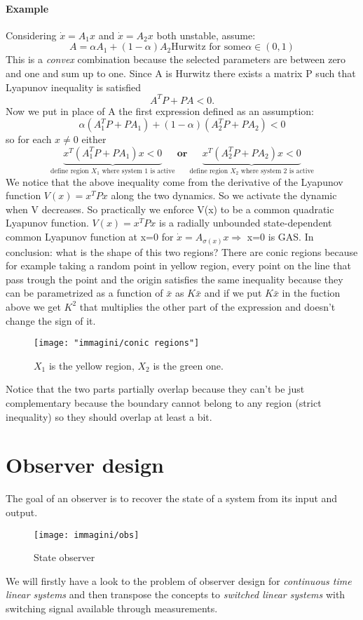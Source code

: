 \paragraph{Example} Considering $\dot{x}=A_1x$ and $\dot{x}=A_2x$ both unstable, assume:
\[
A=\alpha A_1+(1-\alpha)A_2 \text{Hurwitz for some} \alpha \in (0,1)
\]
This is a \emph{convex} combination because the selected parameters are between zero and one and sum up to one. Since A is Hurwitz there exists a matrix P such that Lyapunov inequality is satisfied
\[
A^TP+PA<0.
\]
Now we put in place of A the first expression defined as an assumption:
\[
\alpha(A_1^TP+PA_1)+(1-\alpha)(A_2^TP+PA_2)<0
\]so for each $x\neq0$ either
\[
\underbrace{x^T(A_1^TP+PA_1)x<0}_{\text{define region $X_1$ where system 1 is active}} \ \textbf{or} \ \underbrace{x^T(A_2^TP+PA_2)x<0}_{\text{define region $X_2$ where system 2 is active}}
\]
We notice that the above inequality come from the derivative of the Lyapunov function $V(x)=x^TPx$ along the two dynamics. So we activate the dynamic when V decreases. So practically we enforce V(x) to be a common quadratic Lyapunov function.
$V(x)=x^TPx$ is a radially unbounded state-dependent common Lyapunov function at x=0 for $\dot{x}=A_{\sigma(x)}x$$\Longrightarrow$ x=0 is GAS.
In conclusion: what is the shape of this two regions? There are conic regions because for example taking a random point in yellow region, every point on the line that pass trough the point and the origin satisfies the same inequality because they can be parametrized  as a function of $\bar{x}$ as $K\bar{x}$ and if we put $K\bar{x}$ in the fuction above we get $K^2$ that multiplies the other part of the expression and doesn't change the sign of it.
\begin{figure}[H]
	\centering
	\texttt{[image: "immagini/conic regions"]}
	\caption{$X_1$ is the yellow region, $X_2$ is the green one.}
	\label{fig:conic-regions}
\end{figure}
Notice that the two parts partially overlap because they can't be just complementary because the boundary cannot belong to any region (strict inequality) so they should overlap at least a bit.
\section{Observer design}
The goal of an observer is to recover the state of a system from its input and output.\begin{figure}[H]
	\centering
	\texttt{[image: immagini/obs]}
	\caption{State observer}
	\label{fig:obs}
\end{figure}
We will firstly have a look to the problem of observer design for \emph{continuous time linear systems} and then transpose the concepts to \emph{switched linear systems} with switching signal available through measurements.
